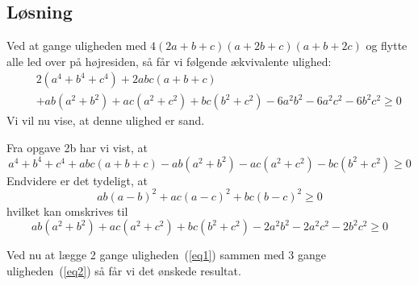 \documentclass[12pt,oneside,a4paper]{article}
\newcommand{\bas}{\begin{eqnarray*}}
\newcommand{\eas}{\end{eqnarray*}}
\newcommand{\be}{\begin{equation}}
\newcommand{\ee}{\end{equation}}
\begin{document}
\subsection{Løsning}
Ved at gange uligheden med $4(2a+b+c)(a+2b+c)(a+b+2c)$ og flytte alle led over på højresiden,
så får vi følgende ækvivalente ulighed:
\bas
&&2(a^4+b^4+c^4) + 2abc(a+b+c) \\
&&+ ab(a^2+b^2)+ac(a^2+c^2)+bc(b^2+c^2) - 6a^2b^2-6a^2c^2-6b^2c^2 \ge 0
\eas
Vi vil nu vise, at denne ulighed er sand.

Fra opgave 2b har vi vist, at
\be
a^4+b^4+c^4+abc(a+b+c) - ab(a^2+b^2) - ac(a^2+c^2) - bc(b^2+c^2)  \ge 0
\label{eq1}
\ee
Endvidere er det tydeligt, at 
$$
ab(a-b)^2 + ac(a-c)^2+bc(b-c)^2 \ge 0
$$
hvilket kan omskrives til
\be
ab(a^2+b^2) + ac(a^2+c^2) +bc(b^2+c^2) -2a^2b^2 -2a^2c^2 -2b^2c^2 \ge 0
\label{eq2}
\ee

Ved nu at lægge 2 gange uligheden~(\ref{eq1}) sammen med 3 gange uligheden~(\ref{eq2}) så får vi det ønskede resultat.
\end{document}
